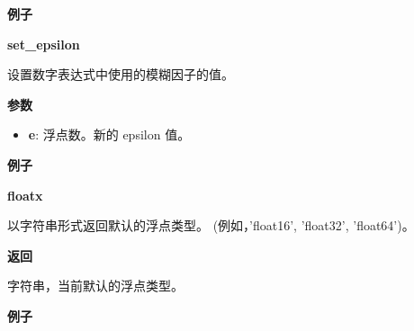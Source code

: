 \textbf{例子}

\begin{Shaded}
\begin{Highlighting}[]
\OperatorTok{>>>} 
\end{Highlighting}
\end{Shaded}


\textbf{set\_epsilon}\label{setux5fepsilon}

\begin{Shaded}
\begin{Highlighting}[]
\end{Highlighting}
\end{Shaded}

设置数字表达式中使用的模糊因子的值。

\textbf{参数}

\begin{itemize}
\tightlist
\item
  \textbf{e}: 浮点数。新的 epsilon 值。
\end{itemize}

\textbf{例子}

\begin{Shaded}
\begin{Highlighting}[]
\OperatorTok{>>>}    
\OperatorTok{>>>} 
\OperatorTok{>>>} \NormalTok{)}
\OperatorTok{>>>} 
\end{Highlighting}
\end{Shaded}


\textbf{floatx}\label{floatx}

\begin{Shaded}
\begin{Highlighting}[]
\end{Highlighting}
\end{Shaded}

以字符串形式返回默认的浮点类型。 (例如，'float16', 'float32',
'float64')。

\textbf{返回}

字符串，当前默认的浮点类型。

\textbf{例子}

\begin{Shaded}
\begin{Highlighting}[]
\OperatorTok{>>>} 
\end{Highlighting}
\end{Shaded}


